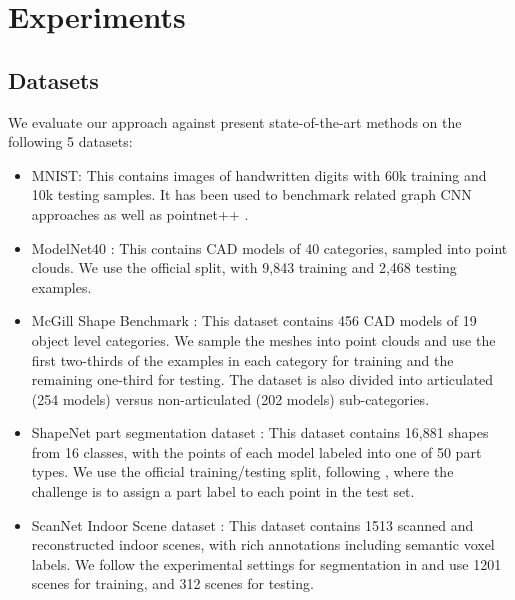 \documentclass[runningheads]{llncs}
\begin{document}
\section{Experiments}\label{sec:exp}
\subsection{Datasets}\label{sec:datasets}

We evaluate our approach against present state-of-the-art methods on the following 5 datasets:
\begin{itemize}
\item MNIST: This contains images of handwritten digits with 60k training and 10k testing samples. It has been used to benchmark related graph CNN approaches \cite{defferrard2016convolutional,monti2016geometric} as well as pointnet++ \cite{qi2017pointnet}.

\item ModelNet40 \cite{wu20153d}: This contains CAD models of 40 categories, sampled into point clouds. We use the official split, with 9,843 training and 2,468 testing examples.

\item McGill Shape Benchmark \cite{siddiqi2008retrieval}: This dataset contains 456 CAD models of 19 object level categories. We sample the meshes into point clouds and use the first two-thirds of the examples in each category for training and the remaining one-third for testing. The dataset is also divided into articulated (254 models) versus non-articulated (202 models) sub-categories.

\item ShapeNet part segmentation dataset \cite{yi2016scalable}: This dataset contains 16,881 shapes from 16 classes, with the points of each model labeled into one of 50 part types. We use the official training/testing split, following \cite{qi2016pointnet,yi2016scalable,yi2016syncspeccnn}, where the challenge is to assign a part label to each point in the test set.

\item ScanNet Indoor Scene dataset \cite{dai2017scannet}: This dataset contains 1513 scanned and reconstructed indoor scenes, with rich annotations including semantic voxel labels. We follow the experimental settings for segmentation in \cite{qi2017pointnet,dai2017scannet} and use 1201 scenes for training, and 312 scenes for testing.
\end{itemize}
\end{document}
